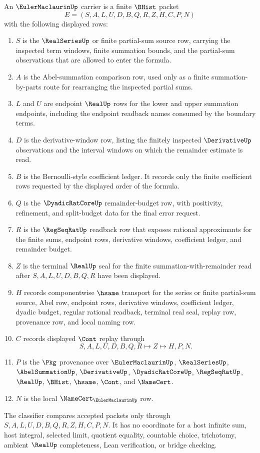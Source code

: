 \begin{definition}
\label{def:euler-maclaurin-carrier}
An $\EulerMaclaurinUp$ carrier is a finite $\BHist$ packet
$$
E=(S,A,L,U,D,B,Q,R,Z,H,C,P,N)
$$
with the following displayed rows:
\begin{enumerate}
\item $S$ is the $\RealSeriesUp$ or finite partial-sum source row, carrying the inspected term windows, finite summation bounds, and the partial-sum observations that are allowed to enter the formula.
\item $A$ is the Abel-summation comparison row, used only as a finite summation-by-parts route for rearranging the inspected partial sums.
\item $L$ and $U$ are endpoint $\RealUp$ rows for the lower and upper summation endpoints, including the endpoint readback names consumed by the boundary terms.
\item $D$ is the derivative-window row, listing the finitely inspected $\DerivativeUp$ observations and the interval windows on which the remainder estimate is read.
\item $B$ is the Bernoulli-style coefficient ledger. It records only the finite coefficient rows requested by the displayed order of the formula.
\item $Q$ is the $\DyadicRatCoreUp$ remainder-budget row, with positivity, refinement, and split-budget data for the final error request.
\item $R$ is the $\RegSeqRatUp$ readback row that exposes rational approximants for the finite sums, endpoint rows, derivative windows, coefficient ledger, and remainder budget.
\item $Z$ is the terminal $\RealUp$ seal for the finite summation-with-remainder read after $S,A,L,U,D,B,Q,R$ have been displayed.
\item $H$ records componentwise $\hsame$ transport for the series or finite partial-sum source, Abel row, endpoint rows, derivative windows, coefficient ledger, dyadic budget, regular rational readback, terminal real seal, replay row, provenance row, and local naming row.
\item $C$ records displayed $\Cont$ replay through
$$
S,A,L,U,D,B,Q,R \longmapsto Z \longmapsto H,P,N .
$$
\item $P$ is the $\Pkg$ provenance over $\EulerMaclaurinUp$, $\RealSeriesUp$, $\AbelSummationUp$, $\DerivativeUp$, $\DyadicRatCoreUp$, $\RegSeqRatUp$, $\RealUp$, $\BHist$, $\hsame$, $\Cont$, and $\NameCert$.
\item $N$ is the local $\NameCert_{\EulerMaclaurinUp}$ row.
\end{enumerate}
The classifier compares accepted packets only through $S,A,L,U,D,B,Q,R,Z,H,C,P,N$. It has no coordinate for a host infinite sum, host integral, selected limit, quotient equality, countable choice, trichotomy, ambient $\RealUp$ completeness, Lean verification, or bridge checking.
\end{definition}

